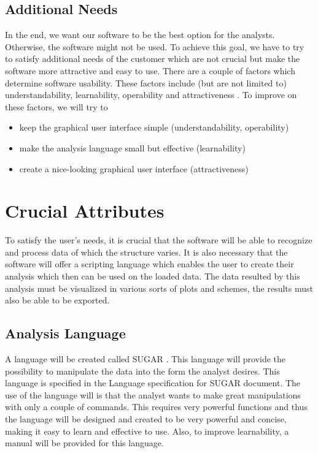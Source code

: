 \documentclass[a4paper]{article}
\begin{document}
\subsection{Additional Needs}
In the end, we want our software to be the best option for the analysts. Otherwise, the software might not be used. To achieve this goal, we have to try to satisfy additional needs of the customer which are not crucial but make the software more attractive and easy to use. There are a couple of factors which determine software usability. These factors include (but are not limited to) understandability, learnability, operability and attractiveness \cite{komiyama}. To improve on these factors, we will try to 
\begin{itemize}
\item keep the graphical user interface simple (understandability, operability) 
\item make the analysis language small but effective (learnability)
\item create a nice-looking graphical user interface (attractiveness) 
\end{itemize}

\section{Crucial Attributes}
To satisfy the user's needs, it is crucial that the software will be able to recognize and process data of which the structure varies. It is also necessary that the software will offer a scripting language which enables the user to create their analysis which then can be used on the loaded data. The data resulted by this analysis must be visualized in various sorts of plots and  schemes, the results must also be able to be exported. 

\subsection{Analysis Language}
A language will be created called SUGAR \cite{sugar}. This language will provide the possibility to manipulate the data into the form the analyst desires. This language is specified in the Language specification for SUGAR document. The use of the language will is that the analyst wants to make great manipulations with only a couple of commands. This requires very powerful functions and thus the language will be designed and created to be very powerful and concise, making it easy to learn and effective to use. Also, to improve learnability, a manual will be provided for this language.
\end{document}
